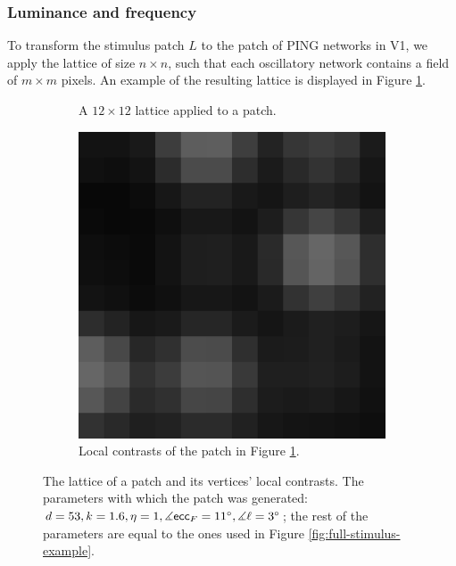 \subsubsection{Luminance and frequency}


To transform the stimulus patch $L$ to the patch of PING networks in V1, we apply the lattice of size $n \times n$, such that each oscillatory network contains a field of $m \times m$ pixels. An example of the resulting lattice is displayed in Figure \ref{fig:llc-lattice-example}.



\begin{figure}[!htp]
    \centering
    \begin{subfigure}[t]{0.4\textwidth}
        \centering
        
        \caption{A $12 \times 12$ lattice applied to a patch.}
        \label{fig:llc-lattice-example}
    \end{subfigure}
    \hspace{0.06\textwidth}
    \begin{subfigure}[t]{0.4\textwidth}
        \centering
        \includegraphics[width=\textwidth]{src/assets/images/local-contrast.png}
        \caption{Local contrasts of the patch in Figure \ref{fig:llc-lattice-example}.}
        \label{fig:llc-local-contrast-example}
    \end{subfigure}
    \caption{The lattice of a patch and its vertices' local contrasts. The parameters with which the patch was generated: $d = 53, k = 1.6, \eta = 1, \measuredangle \mathsf{ecc}_F = 11^\circ, \measuredangle \ell = 3^\circ$; the rest of the parameters are equal to the ones used in Figure \ref{fig:full-stimulus-example}.}
    \label{fig:lattice-local-contrast-example}
\end{figure}




